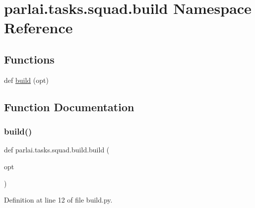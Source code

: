 \hypertarget{namespaceparlai_1_1tasks_1_1squad_1_1build}{}\section{parlai.\+tasks.\+squad.\+build Namespace Reference}
\label{namespaceparlai_1_1tasks_1_1squad_1_1build}
\subsection*{Functions}
\begin{DoxyCompactItemize}
\item 
def \hyperlink{namespaceparlai_1_1tasks_1_1squad_1_1build_aaf903c1fa0ac0b6cd2e9eb37d5d001a1}{build} (opt)
\end{DoxyCompactItemize}


\subsection{Function Documentation}
\mbox{\label{namespaceparlai_1_1tasks_1_1squad_1_1build_aaf903c1fa0ac0b6cd2e9eb37d5d001a1}} 
\subsubsection{\texorpdfstring{build()}{build()}}
{\footnotesize\ttfamily def parlai.\+tasks.\+squad.\+build.\+build (\begin{DoxyParamCaption}\item[{}]{opt }\end{DoxyParamCaption})}



Definition at line 12 of file build.\+py.

